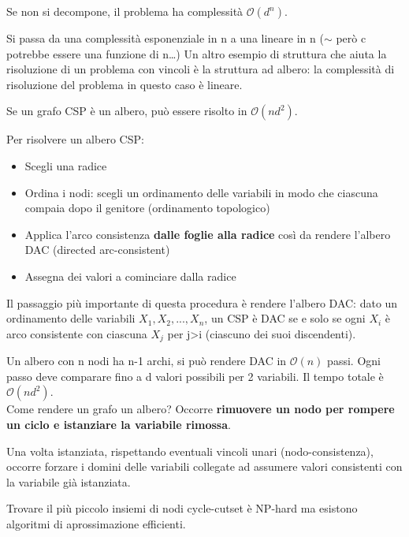 Se non si decompone, il problema ha complessità $\mathcal{O}(d^n)$.

Si passa da una complessità esponenziale in n a una lineare in n ($\sim$
però c potrebbe essere una funzione di n\dots)
Un altro esempio di struttura che aiuta la risoluzione di un problema con
vincoli è la struttura ad albero: la complessità di risoluzione del problema
in questo caso è lineare.

Se un grafo CSP è un albero, può essere risolto in $\mathcal{O}(nd^2)$.

Per risolvere un albero CSP:

\begin{itemize}
 \item Scegli una radice
 \item Ordina i nodi: scegli un ordinamento delle variabili in modo che
ciascuna compaia dopo il genitore (ordinamento topologico)
 \item Applica l'arco consistenza \textbf{dalle foglie alla radice}
così da rendere l'albero DAC (directed arc-consistent)
 \item Assegna dei valori a cominciare dalla radice
\end{itemize}

Il passaggio più importante di questa procedura è rendere l'albero
DAC: dato un ordinamento delle variabili $X_1, X_2, ..., X_n$,
un CSP è DAC se e solo se ogni $X_i$ è arco consistente
con ciascuna $X_j$ per j>i (ciascuno dei suoi discendenti).

Un albero con n nodi ha n-1 archi, si può rendere DAC in
$\mathcal{O}(n)$ passi. Ogni passo deve comparare fino a
d valori possibili per 2 variabili. Il tempo totale è
$\mathcal{O}(nd^2)$.\\

Come rendere un grafo un albero? Occorre \textbf{rimuovere un nodo
per rompere un ciclo e istanziare la variabile rimossa}.

Una volta istanziata, rispettando eventuali vincoli unari
(nodo-consistenza), occorre forzare i domini delle variabili collegate
ad assumere valori consistenti con la variabile già istanziata.

Trovare il più piccolo insiemi di nodi cycle-cutset è NP-hard
ma esistono algoritmi di aprossimazione efficienti.
